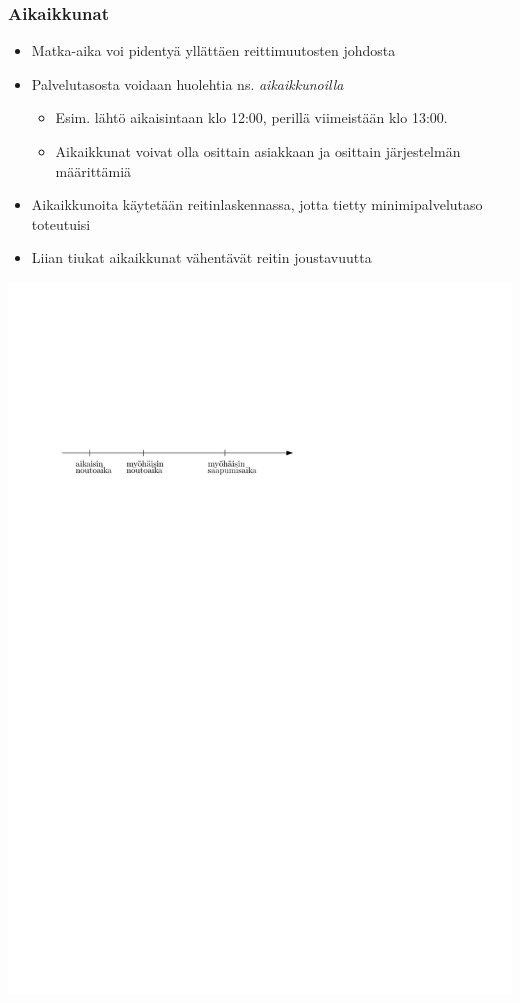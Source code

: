 \documentclass{beamer}
\begin{document}
    
\begin{frame}
\frametitle{Aikaikkunat}
\begin{itemize}
 \item 
 Matka-aika voi pidentyä yllättäen reittimuutosten johdosta
 \item
 Palvelutasosta voidaan huolehtia ns. \emph{aikaikkunoilla}
 \begin{itemize}
  \item 
  Esim. lähtö aikaisintaan klo 12:00, perillä viimeistään klo 13:00.
  \item 
  Aikaikkunat voivat olla osittain asiakkaan ja osittain järjestelmän määrittämiä
 \end{itemize}
 \item
 Aikaikkunoita käytetään reitinlaskennassa, jotta tietty minimipalvelutaso toteutuisi
 \item
 Liian tiukat aikaikkunat vähentävät reitin joustavuutta
\end{itemize}
\begin{center}
\includegraphics[scale=0.8]{aikaikkuna01}
\end{center}
\end{frame}    
    
\end{document}
